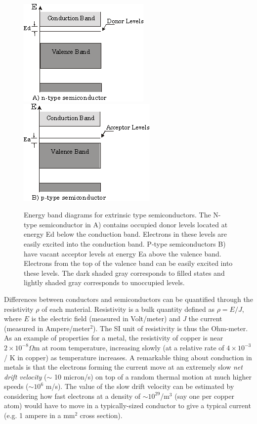 \documentclass{../lab}
\begin{document}
\begin{figure}[h]
    \includegraphics[width=0.5\linewidth]{images/EnergyBandNType.png}
    \includegraphics[width=0.5\linewidth]{images/EnergyBandPType.png}
    \caption{Energy band diagrams for extrinsic type semiconductors. The N-type semiconductor in A) contains occupied donor levels located at energy Ed below the conduction band. Electrons in these levels are easily excited into the conduction band. P-type semiconductors B) have vacant acceptor levels at energy Ea above the valence band. Electrons from the top of the valence band can be easily excited into these levels. The dark shaded gray corresponds to filled states and lightly shaded gray corresponds to unoccupied levels.}
\end{figure}

Differences between conductors and semiconductors can be quantified through the resistivity $\rho$ of each material. Resistivity is a bulk quantity defined as $\rho = E / J$, where $E$ is the electric field (measured in Volt/meter) and \emph{J} the current (measured in Ampere/meter$^2$). The SI unit of resistivity is thus the Ohm-meter. As an example of properties for a metal, the resistivity of copper is near $2 \times 10^{-8} \Omega$m at room temperature, increasing slowly (at a relative rate of $4 \times 10^{-3}$ / K in copper) as temperature increases. A remarkable thing about conduction in metals is that the electrons forming the current move at an extremely slow \emph{net drift velocity} ($\sim$ 10 micron/s) on top of a random thermal motion at much higher speeds ($\sim 10^6$ m/s). The value of the slow drift velocity can be estimated by considering how fast electrons at a density of $\sim 10^{29}$/m$^3$ (say one per copper atom) would have to move in a typically-sized conductor to give a typical current (e.g. 1 ampere in a mm$^{2}$ cross section).
\end{document}
